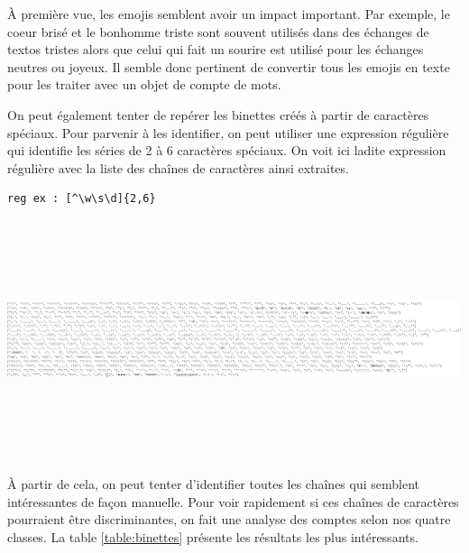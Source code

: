 
À première vue, les emojis semblent avoir un impact important. Par exemple, le coeur brisé et le bonhomme triste sont souvent utilisés dans des échanges de textos tristes alors que celui qui fait un sourire est utilisé pour les échanges neutres ou joyeux. Il semble donc pertinent de convertir tous les emojis en texte pour les traiter avec un objet de compte de mots.

On peut également tenter de repérer les binettes créés à partir de caractères spéciaux. Pour parvenir à les identifier, on peut utiliser une expression régulière qui identifie les séries de 2 à 6 caractères spéciaux. On voit ici ladite expression régulière avec la liste des chaînes de caractères ainsi extraites.
\begin{verbatim}
reg ex : [^\w\s\d]{2,6}
\end{verbatim}

\includegraphics[width=\linewidth,height=7cm]{images/analyse_list_car_speciaux}

À partir de cela, on peut tenter d'identifier toutes les chaînes qui semblent intéressantes de façon manuelle. Pour voir rapidement si ces chaînes de caractères pourraient être discriminantes, on fait une analyse des comptes selon nos quatre classes. La table \ref{table:binettes} présente les résultats les plus intéressants.

